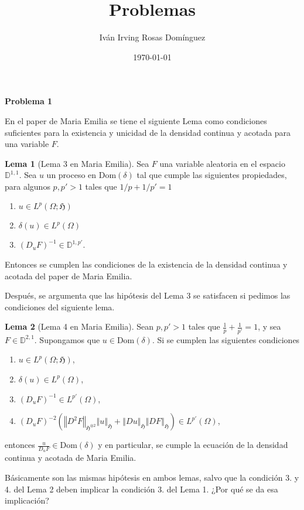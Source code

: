 \documentclass[letterpaper]{article}
\title{\textbf{Problemas}}
\author{Iván Irving Rosas Domínguez}
\date{\today}
\newcommand{\D}{\mathbb{D}}
\newcommand{\1}{\mathds{1}}
\newcommand{\norm}[1]{\left\Vert #1 \right\Vert}
\theoremstyle{definition}
\theoremstyle{definition}
\theoremstyle{remark}
\theoremstyle{definition}
\theoremstyle{definition}
\theoremstyle{definition}
\theoremstyle{definition}
\theoremstyle{definition}
\newtheorem{lema}{Lema}
\begin{document}
\maketitle
\textbf{Problema 1} 

   En el paper de Maria Emilia se tiene el siguiente Lema como condiciones suficientes para la existencia y unicidad de la densidad continua y acotada para una variable $F$.
   \begin{lema}[Lema 3 en Maria Emilia]
    Sea $F$ una variable aleatoria en el espacio $\D^{1,1}$. Sea $u$ un proceso en $\text{Dom}(\delta)$ tal que cumple las siguientes propiedades, para algunos $p,p'>1$ tales que $1/p+1/p'=1$
    \begin{enumerate}
        \item $u\in L^{p}(\Omega;\mathfrak{H})$
        \item $\delta(u)\in L^{p}(\Omega)$
        \item $(D_uF)^{-1}\in \D^{1,p'}$.
    \end{enumerate}
    Entonces se cumplen las condiciones de la existencia de la densidad continua y acotada del paper de Maria Emilia.
   \end{lema}
   
   Después, se argumenta que las hipótesis del Lema 3 se satisfacen si pedimos las condiciones del siguiente lema.
   \begin{lema}[Lema 4 en Maria Emilia]
    Sean $p,p'>1$ tales que $\frac{1}{p}+\frac{1}{p'}=1$, y sea $F\in \D^{2,1}$. Supongamos que $u\in \text{Dom}(\delta)$. Si se cumplen las siguientes condiciones 
    \begin{enumerate}
      \item $u\in L^{p}(\Omega;\mathfrak{H})$,
      \item $\delta(u)\in L^{p}(\Omega)$,
      \item $(D_uF)^{-1}\in L^{p'}(\Omega)$,
      \item $(D_uF)^{-2}\left(\norm{D^2F}_{\mathfrak{H}^{\otimes 2}}\norm{u}_{\mathfrak{H}}+\norm{Du}_{\mathfrak{H}}\norm{DF}_{\mathfrak{H}}\right)\in L^{p'}(\Omega)$,
    \end{enumerate}
    entonces $\tfrac{u}{D_uF}\in \text{Dom}(\delta)$ y en particular, se cumple la ecuación de la densidad continua y acotada de Maria Emilia.
    \end{lema}
    Básicamente son las mismas hipótesis en ambos lemas, salvo que la condición 3. y 4. del Lema 2 deben implicar la condición 3. del Lema 1. ¿Por qué se da esa implicación?
\end{document}
